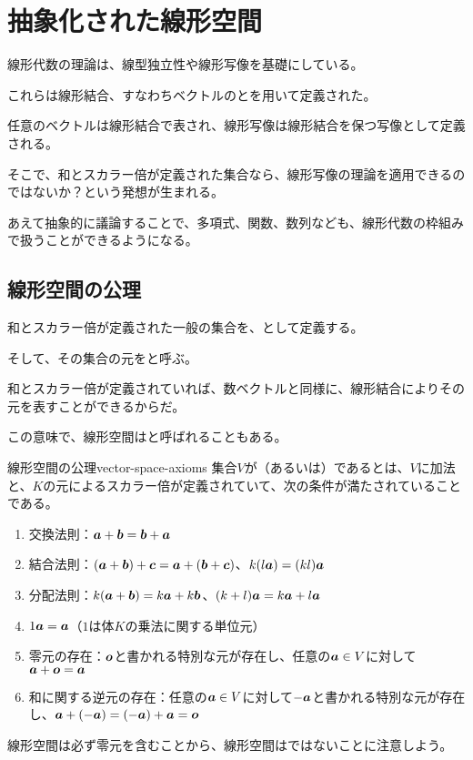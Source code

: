\documentclass[../../../topic_linear-algebra]{subfiles}
\begin{document}
\sectionline
\section{抽象化された線形空間}

線形代数の理論は、線型独立性や線形写像を基礎にしている。

\br

これらは線形結合、すなわちベクトルのとを用いて定義された。

任意のベクトルは線形結合で表され、線形写像は線形結合を保つ写像として定義される。

\br

そこで、和とスカラー倍が定義された集合なら、線形写像の理論を適用できるのではないか？という発想が生まれる。

あえて抽象的に議論することで、多項式、関数、数列なども、線形代数の枠組みで扱うことができるようになる。

\subsection{線形空間の公理}

和とスカラー倍が定義された一般の集合を、として定義する。

\br

そして、その集合の元をと呼ぶ。

和とスカラー倍が定義されていれば、数ベクトルと同様に、線形結合によりその元を表すことができるからだ。

この意味で、線形空間はと呼ばれることもある。

\begin{definition}{線形空間の公理}{vector-space-axioms}
  集合$V$が（あるいは）であるとは、$V$に加法と、$K$の元によるスカラー倍が定義されていて、次の条件が満たされていることである。
  \begin{enumerate}[label=\romanlabel]
    \item 交換法則：$\vb*{a} + \vb*{b} = \vb*{b} + \vb*{a}$
    \item 結合法則：$(\vb*{a} + \vb*{b}) + \vb*{c} = \vb*{a} + (\vb*{b} + \vb*{c})$、$k(l\vb*{a}) = (kl)\vb*{a}$
    \item 分配法則：$k(\vb*{a} + \vb*{b}) = k\vb*{a} + k\vb*{b}$、$(k + l)\vb*{a} = k\vb*{a} + l\vb*{a}$
    \item $1 \vb*{a} = \vb*{a}$（$1$は体$K$の乗法に関する単位元）
    \item 零元の存在：$\vb*{o}$と書かれる特別な元が存在し、任意の$\vb*{a} \in V$に対して$\vb*{a} + \vb*{o} = \vb*{a}$
    \item 和に関する逆元の存在：任意の$\vb*{a} \in V$に対して$-\vb*{a}$と書かれる特別な元が存在し、$\vb*{a} + (-\vb*{a}) = (-\vb*{a}) + \vb*{a} = \vb*{o}$
  \end{enumerate}
\end{definition}

線形空間は必ず零元を含むことから、線形空間はではないことに注意しよう。
\end{document}
